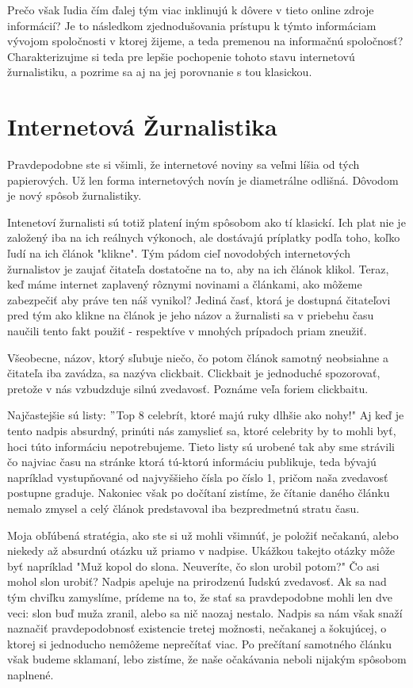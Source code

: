 \documentclass{sig-alternate}
\begin{document}
Prečo však ľudia čím ďalej tým viac inklinujú k dôvere v tieto online zdroje informácií? Je to následkom zjednodušovania prístupu k týmto informáciam vývojom spoločnosti v ktorej žijeme, a teda premenou na informačnú spoločnosť?
Charakterizujme si teda pre lepšie pochopenie tohoto stavu internetovú žurnalistiku, a pozrime sa aj na jej porovnanie s tou klasickou.
\section{Internetová Žurnalistika}
Pravdepodobne ste si všimli, že internetové noviny sa veľmi líšia od tých papierových. Už len forma internetových novín je diametrálne odlišná. Dôvodom je nový spôsob žurnalistiky.

Intenetoví žurnalisti sú totiž platení iným spôsobom ako tí klasickí. Ich plat nie je založený iba na ich reálnych výkonoch, ale dostávajú príplatky podľa toho, koľko ľudí na ich článok "klikne".\cite{b} Tým pádom cieľ novodobých internetových žurnalistov je zaujať čitateľa dostatočne na to, aby na ich článok klikol. Teraz, keď máme internet zaplavený rôznymi novinami a článkami, ako môžeme zabezpečiť aby práve ten náš vynikol? Jediná časť, ktorá je dostupná čitateľovi pred tým ako klikne na článok je jeho názov a žurnalisti sa v priebehu času naučili tento fakt použiť - respektíve v mnohých prípadoch priam zneužiť.\cite{a}

Všeobecne, názov, ktorý sľubuje niečo, čo potom článok samotný neobsiahne a čitateľa iba zavádza, sa nazýva clickbait. Clickbait je jednoduché spozorovať, pretože v nás vzbudzduje silnú zvedavosť. Poznáme veľa foriem clickbaitu. 

Najčastejšie sú listy: $"$Top 8 celebrít, ktoré majú ruky dlhšie ako nohy!" \cite{i} Aj keď je tento nadpis absurdný, prinúti nás zamyslieť sa, ktoré celebrity by to mohli byť, hoci túto informáciu nepotrebujeme. Tieto listy sú urobené tak aby sme strávili čo najviac času na stránke ktorá tú-ktorú informáciu publikuje, teda bývajú napríklad vystupňované od najvyššieho čísla po číslo 1, pričom naša zvedavosť postupne graduje. Nakoniec však po dočítaní zistíme, že čítanie daného článku nemalo zmysel a celý článok predstavoval iba bezpredmetnú stratu času.

Moja obľúbená stratégia, ako ste si už mohli všimnúť, je položiť nečakanú, alebo niekedy až absurdnú otázku už priamo v nadpise. \cite{j} Ukážkou takejto otázky môže byť napríklad "Muž kopol do slona. Neuveríte, čo slon urobil potom?" Čo asi mohol slon urobiť? Nadpis apeluje na prirodzenú ľudskú zvedavosť. Ak sa nad tým chviľku zamyslíme, prídeme na to, že stať sa pravdepodobne mohli len dve veci: slon buď muža zranil, alebo sa nič naozaj nestalo. Nadpis sa nám však snaží naznačiť pravdepodobnosť existencie tretej možnosti, nečakanej a šokujúcej, o ktorej si jednoducho nemôžeme neprečítať viac. Po prečítaní samotného článku však budeme sklamaní, lebo zistíme, že naše očakávania neboli nijakým spôsobom naplnené.
\end{document}
